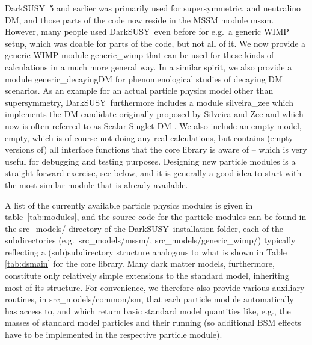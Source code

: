 \documentclass[a4paper,10pt,oneside]{book}
\newcommand{\code}[1]{\ft{#1}}
\newcommand{\ds}{{\sffamily DarkSUSY}}
\newcommand{\ft}[1]{\textsf{#1}}
\begin{document}
\ds\ 5 and earlier was primarily used for supersymmetric, and neutralino DM, and those 
parts of the code now reside in the MSSM module \code{mssm}. However, many people 
used \ds\ even before for e.g.\ a generic WIMP setup, which was doable for parts of the 
code, but not all of it. We now provide a generic WIMP module \code{generic\_wimp} that 
can be used for these kinds of calculations in a much more general way. 
 In a similar spirit,
we also provide a module \code{generic\_decayingDM} for phenomenological studies
of decaying DM scenarios. As an example for an actual particle physics model
other than supersymmetry,
\ds\  furthermore includes a module \code{silveira\_zee} which implements the
DM candidate originally proposed by Silveira and Zee \cite{Silveira:1985rk} and which 
now is often
referred to as Scalar Singlet DM \cite{McDonald:1993ex,Burgess:2000yq,Cline:2013gha}.
We also include an empty model, \code{empty}, 
which is of course not doing any real calculations, but contains (empty versions of) all
interface functions that the core library is aware of -- which is very useful for debugging and
testing purposes. Designing new particle modules is 
a straight-forward exercise, see below, and it is generally a good idea 
to start with the most similar module that is already available.

A list of the currently available particle physics modules is given in table~\ref{tab:modules},
and the source code for the particle modules can be found in the \code{src\_models/} 
directory of the \ds\ installation folder, each of the subdirectories 
(e.g.~\code{src\_models/mssm/}, \code{src\_models/generic\_wimp/}) typically 
reflecting a (sub)subdirectory structure analogous to what is shown in Table \ref{tab:dsmain}
for the core library. 
%
Many dark matter models, furthermore, constitute only relatively simple extensions to the 
standard model, inheriting most of its structure. For convenience,
we therefore also provide various auxiliary routines, in \code{src\_models/common/sm}, that each particle module 
automatically has access to, and which return basic standard model quantities like, e.g., the masses
of standard model particles and their running (so additional BSM effects have to be implemented in the
respective particle module).
\end{document}
